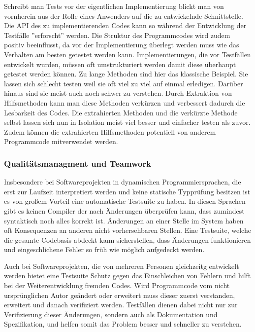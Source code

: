 Schreibt man Tests vor der eigentlichen Implementierung blickt man von
vornherein aus der Rolle eines Anwenders auf die zu entwickelnde
Schnittstelle. Die API des zu implementierenden Codes kann so während
der Entwicklung der Testfälle ''erforscht'' werden. Die Struktur des
Programmcodes wird zudem positiv beeinflusst, da vor der
Implementierung überlegt werden muss wie das Verhalten am besten
getestet werden kann. Implementierungen, die vor Testfällen entwickelt
wurden, müssen oft umstrukturiert werden damit diese überhaupt
getestet werden können. Zu lange Methoden sind hier das klassische
Beispiel. Sie lassen sich schlecht testen weil sie oft viel zu viel
auf einmal erledigen. Darüber hinaus sind sie meist auch noch schwer
zu verstehen. Durch Extraktion von Hilfsmethoden kann man diese
Methoden verkürzen und verbessert dadurch die Lesbarkeit des
Codes. Die extrahierten Methoden und die verkürzte Methode selbst
lassen sich nun in Isolation meist viel besser und einfacher testen
als zuvor. Zudem können die extrahierten Hilfsmethoden potentiell von
anderem Programmcode mitverwendet werden.

\subsubsection{Qualitätsmanagment und Teamwork}

Insbesondere bei Softwareprojekten in dynamischen Programmiersprachen,
die erst zur Laufzeit interpretiert werden und keine statische
Typprüfung besitzen ist es von großem Vorteil eine automatische
Testsuite zu haben. In diesen Sprachen gibt es keinen Compiler der
nach Änderungen überprüfen kann, dass zumindest syntaktisch noch alles
korrekt ist. Änderungen an einer Stelle im System haben oft
Konsequenzen an anderen nicht vorhersehbaren Stellen. Eine Testsuite,
welche die gesamte Codebasis abdeckt kann sicherstellen, dass
Änderungen funktionieren und eingeschlichene Fehler so früh wie
möglich aufgedeckt werden.

Auch bei Softwareprojekten, die von mehreren Personen gleichzeitg
entwickelt werden bietet eine Testsuite Schutz gegen das Einschleichen
von Fehlern und hilft bei der Weiterentwicklung fremden Codes. Wird
Programmcode vom nicht ursprünglichen Autor geändert oder erweitert
muss dieser zuerst verstanden, erweitert und danach verifiziert
werden. Testfällen dienen dabei nicht nur zur Verifizierung dieser
Änderungen, sondern auch als Dokumentation und Spezifikation, und
helfen somit das Problem besser und schneller zu verstehen.

